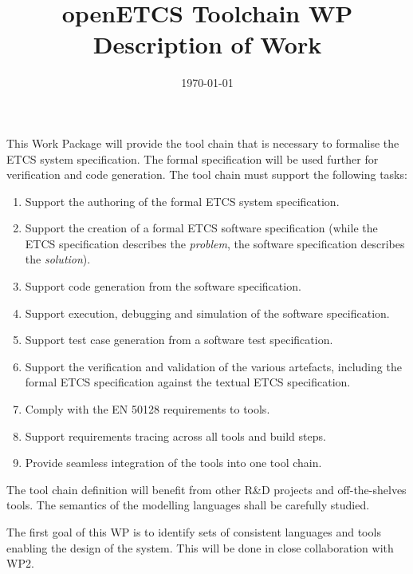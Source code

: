 \documentclass[11pt, a4paper]{article}
\title{openETCS Toolchain WP Description of Work}
\date{\today}
\begin{document}
\maketitle

This Work Package will provide the tool chain that is necessary to formalise the ETCS system specification.  The formal specification will be used further for verification and code generation.  The tool chain must support the following tasks:

\begin{enumerate}
\item Support the authoring of the formal ETCS system specification.

\item Support the creation of a formal ETCS software specification (while the ETCS specification describes the \emph{problem}, the software specification describes the \emph{solution}).

\item Support code generation from the software specification.

\item Support execution, debugging and simulation of the software specification.

\item Support test case generation from a software test specification.

\item Support the verification and validation of the various artefacts, including the formal ETCS specification against the textual ETCS specification.

\item Comply with the EN 50128 requirements to tools.

\item Support requirements tracing across all tools and build steps. 

\item Provide seamless integration of the tools into one tool chain. 
 
\end{enumerate}

The tool chain definition will benefit from other R\&D projects and off-the-shelves tools. The semantics of the modelling languages shall be carefully studied.

The first goal of this WP is to identify sets of consistent languages and tools enabling the design of the system.  This will be done in close collaboration with WP2.
\end{document}
